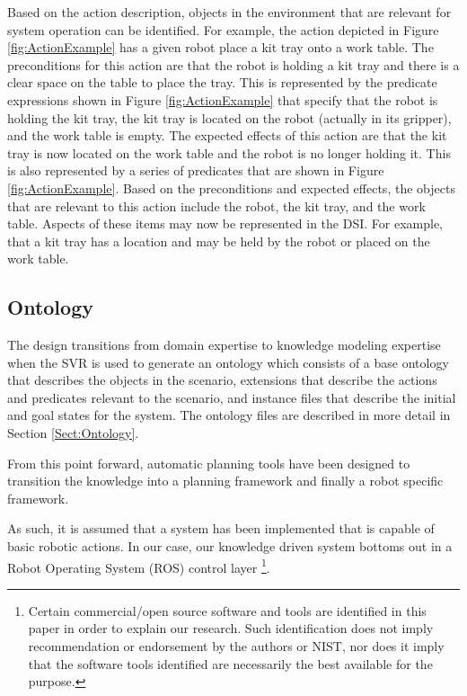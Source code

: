 Based on the action description, objects in the environment that are relevant 
for system operation can be identified. For example, the action depicted in Figure \ref{fig:ActionExample}
has a given robot place a kit tray onto a work table. The preconditions for this action are that
the robot is holding a kit tray and there is a clear space on the table to place the tray. This is
represented by the predicate expressions shown in Figure \ref{fig:ActionExample} that specify that
the robot is holding the kit tray, the kit tray is located on the robot (actually in its gripper), and
the work table is empty. The expected effects of this action are that the kit tray is now located
on the work table and the robot is no longer holding it. This is also represented by a series
of predicates that are shown in Figure \ref{fig:ActionExample}. Based on the preconditions and expected effects,
the objects that are relevant to this action include the robot, the kit tray, and the work table.
Aspects of these items may now be represented in the DSI. For example, that a kit tray has a location and may
be held by the robot or placed on the work table.

\subsection{Ontology}
The design transitions from domain expertise to knowledge modeling expertise
when the SVR is used to generate an ontology which consists of a base ontology
that describes the objects in the scenario, extensions that describe the
actions and predicates relevant to the scenario, and instance files that
describe the initial and goal states for the system. The ontology files are
described in more detail in Section \ref{Sect:Ontology}.

From this point forward, automatic planning tools have been designed to transition 
the knowledge into a planning framework and finally a robot specific framework.

As such, it is assumed that a system has been implemented
that is capable of basic robotic actions. In our case, our knowledge
driven system bottoms out in a Robot Operating System (ROS) control layer
\footnote{Certain commercial/open source software and tools are identified 
in this paper in order to explain our research. Such identification does not imply
recommendation or endorsement by the authors or NIST, nor does it 
imply that the software tools identified are necessarily the best available for the purpose.}.